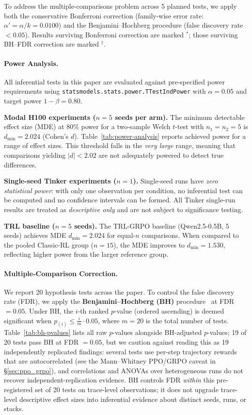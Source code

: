 \documentclass{article}
\begin{document}
To address the multiple-comparisons problem across 5 planned tests,
we apply both the conservative Bonferroni correction (family-wise error rate:
$\alpha' = \alpha / k = 0.0100$) and the Benjamini--Hochberg procedure
(false discovery rate $< 0.05$). Results surviving Bonferroni correction are
marked $^*$; those surviving BH--FDR correction are marked $^\dag$.

\paragraph{Power Analysis.}
All inferential tests in this paper are evaluated against pre-specified power
requirements using \texttt{statsmodels.stats.power.TTestIndPower} with
$\alpha = 0.05$ and target power $1 - \beta = 0.80$.

\textbf{Modal H100 experiments ($n = 5$ seeds per arm).}
The minimum detectable effect size (MDE) at 80\% power for a two-sample
Welch $t$-test with $n_1 = n_2 = 5$ is
$d_{\min} = 2.024$ (Cohen's $d$).
Table~\ref{tab:power-analysis} reports achieved power for a range of effect sizes.
This threshold falls in the \emph{very large} range, meaning that
comparisons yielding $|d| < 2.02$
are not adequately powered to detect true differences.

\textbf{Single-seed Tinker experiments ($n = 1$).}
Single-seed runs have \emph{zero statistical power}: with only one observation per
condition, no inferential test can be computed and no confidence intervals can be
formed.  All Tinker single-run results are treated as \emph{descriptive only} and
are not subject to significance testing.

\textbf{TRL baseline ($n = 5$ seeds).}
The TRL-GRPO baseline (Qwen2.5-0.5B, 5 seeds) achieves MDE
$d_{\min} = 2.024$ for equal-$n$ comparisons.
When compared to the pooled Classic-RL group ($n = 15$), the MDE
improves to $d_{\min} = 1.530$,
reflecting higher power from the larger reference group.

\paragraph{Multiple-Comparison Correction.}
We report 20 hypothesis tests across the paper.
To control the false discovery rate (FDR), we apply the
\textbf{Benjamini--Hochberg (BH)} procedure~\cite{benjamini1995controlling}
at FDR $= 0.05$.  Under BH, the $i$-th ranked $p$-value (ordered ascending)
is deemed significant when $p_{(i)} \le \frac{i}{m} \cdot 0.05$,
where $m = 20$ is the total number of tests.
Table~\ref{tab:bh-pvalues} lists all raw $p$-values alongside BH-adjusted
$p$-values; 19 of 20 tests pass BH at FDR $=0.05$, but we caution against
reading this as 19 independently replicated findings: several tests use
per-step trajectory rewards that are autocorrelated (see the Mann--Whitney
PPO/GRPO caveat in \S\ref{sec:ppo_grpo}), and correlations and ANOVAs
over heterogeneous runs do not recover independent-replication evidence.
BH controls FDR \emph{within} this pre-registered set of 20 tests on
trace-level observations; it does not upgrade trace-level descriptive
effect sizes into inferential evidence about distinct seeds, runs, or stacks.
\end{document}
